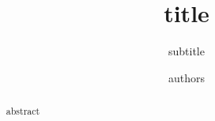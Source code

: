 \documentclass[journal=tosc,preprint,spthm]{iacrtrans}
\author{authors}
\institute{institutions}
\title{title}
\subtitle{subtitle}
\begin{document}
\maketitle


\begin{abstract}
  abstract
\end{abstract}

\vfill
\tableofcontents
\newpage











\end{document}
